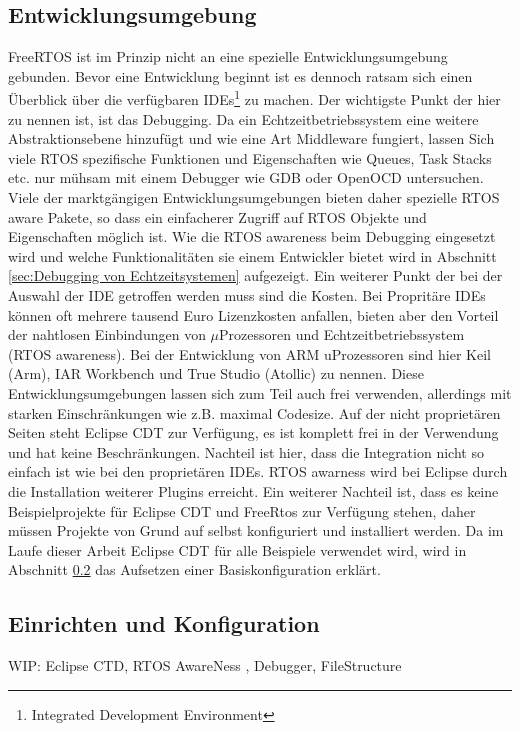 \documentclass[ngerman]{seminarvorlage}
\begin{document}
\subsection{Entwicklungsumgebung}
FreeRTOS ist im Prinzip nicht an eine spezielle Entwicklungsumgebung gebunden. Bevor eine Entwicklung be\-ginnt ist es dennoch ratsam sich einen Überblick über die ver\-fügbaren IDEs\footnote{Integrated Development Environment} zu machen. Der wichtigste Punkt der hier zu nennen ist, ist das Debugging. Da ein Echtzeitbetriebssystem eine weitere Abstraktionsebene hinzufügt und wie eine Art Middleware fungiert, lassen Sich viele RTOS spezifische Funktionen und Eigenschaften wie Queues, Task Stacks etc. nur mühsam mit einem Debugger wie GDB oder OpenOCD untersuchen. Viele der marktgängigen Entwicklungsumgebungen bieten daher spezielle RTOS aware Pakete, so dass ein einfacherer Zugriff auf RTOS Objekte und Eigenschaften möglich ist. Wie die RTOS awareness beim Debugging eingesetzt wird und welche Funktionalitäten sie einem Entwickler bietet wird in Abschnitt \ref{sec:Debugging von Echtzeitsystemen} aufgezeigt. Ein weiterer Punkt der bei der Auswahl der IDE getroffen werden muss sind die Kosten. Bei Propritäre IDEs können oft mehrere tausend Euro Lizenzkosten anfallen, bieten aber den Vorteil der nahtlosen Einbindungen von $\mu$Prozessoren und Echtzeitbetriebssystem (RTOS awareness). Bei der Entwicklung von ARM uProzessoren sind hier Keil (Arm), IAR Workbench und True Studio (Atollic) zu nennen. Diese Entwicklungsumgebungen lassen sich zum Teil auch frei verwenden, allerdings mit starken Einschränkungen wie z.B. maximal Codesize. Auf der nicht proprietären Seiten steht Eclipse CDT zur Verfügung, es ist komplett frei in der Verwendung und hat keine Beschränkungen. Nachteil ist hier, dass die Integration nicht so einfach ist wie bei den proprietären IDEs. RTOS awarness wird bei Eclipse durch die Installation weiterer Plugins erreicht. Ein weiterer Nachteil ist, dass es keine Beispielprojekte für Eclipse CDT und FreeRtos zur Verfügung stehen, daher müssen Projekte von Grund auf selbst konfiguriert und installiert werden. Da im Laufe dieser Arbeit Eclipse CDT für alle Beispiele verwendet wird, wird in Abschnitt \ref{sec:Einrichtung und Konfiguration} das Aufsetzen einer Basiskonfiguration erklärt. 

\subsection{Einrichten und Konfiguration}
\label{sec:Einrichtung und Konfiguration}
WIP: Eclipse CTD, RTOS AwareNess , Debugger, FileStructure
\end{document}
